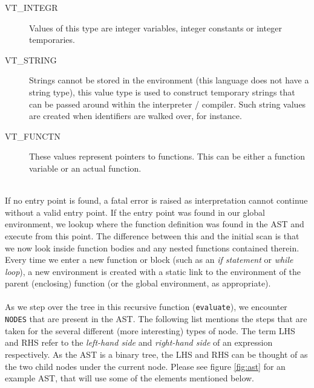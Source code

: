 \begin{description}
	\item[VT\_INTEGR] Values of this type are integer variables, integer constants or integer temporaries.
	\item[VT\_STRING] Strings cannot be stored in the environment (this language does not have a string type), this value type is used to construct temporary strings that can be passed around within the interpreter / compiler. Such string values are created when identifiers are walked over, for instance.
	\item[VT\_FUNCTN] These values represent pointers to functions. This can be either a function variable or an actual function.
\end{description}

\ \\
If no entry point is found, a fatal error is raised as interpretation cannot continue without a valid entry point. If the entry point was found in our global environment, we lookup where the function definition was found in the AST and execute from this point. The difference between this and the initial scan is that we now look inside function bodies and any nested functions contained therein. Every time we enter a new function or block (such as an \emph{if statement} or \emph{while loop}), a new environment is created with a static link to the environment of the parent (enclosing) function (or the global environment, as appropriate).
\ \\ \ \\
As we step over the tree in this recursive function (\verb!evaluate!), we encounter \verb!NODES! that are present in the AST. The following list mentions the steps that are taken for the several different (more interesting) types of node. The term LHS and RHS refer to the \emph{left-hand side} and \emph{right-hand side} of an expression respectively. As the AST is a binary tree, the LHS and RHS can be thought of as the two child nodes under the current node. Please see figure \ref{fig:ast} for an example AST, that will use some of the elements mentioned below.

